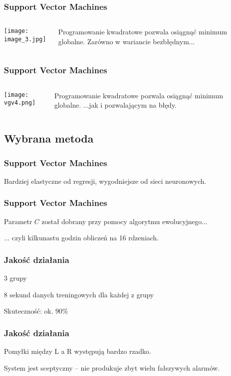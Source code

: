 \documentclass{beamer}
\begin{document}
\begin{frame} \frametitle{Support Vector Machines}
\begin{columns}
\begin{column}{5cm}
\texttt{[image: image\_3.jpg]}
\end{column}
\begin{column}{5cm}
Programowanie kwadratowe pozwala osiągnąć minimum globalne.
Zarówno w wariancie bezbłędnym...
\end{column} 
\end{columns}
\end{frame}

\begin{frame} \frametitle{Support Vector Machines}
\begin{columns}
\begin{column}{5cm}
\texttt{[image: vgv4.png]}
\end{column}
\begin{column}{5cm}
Programowanie kwadratowe pozwala osiągnąć minimum globalne.
...jak i pozwalającym na błędy.
\end{column} 
\end{columns}
\end{frame}

\subsection{Wybrana metoda}

\begin{frame} \frametitle{Support Vector Machines}
Bardziej elastyczne od regresji, wygodniejsze od sieci neuronowych.
\end{frame}

\begin{frame} \frametitle{Support Vector Machines}
Parametr $C$ został dobrany przy pomocy algorytmu ewolucyjnego...

\pause ... czyli kilkunastu godzin obliczeń na 16 rdzeniach.
\end{frame}

\begin{frame} \frametitle{Jakość działania}
$3$ grupy

$8$ sekund danych treningowych dla każdej z grupy

Skuteczność: ok. $90\%$
\end{frame}


\begin{frame} \frametitle{Jakość działania}
Pomyłki między L a R występują bardzo rzadko.

System jest sceptyczny -- nie produkuje zbyt wielu fałszywych alarmów. \pause
\end{frame}
\end{document}
